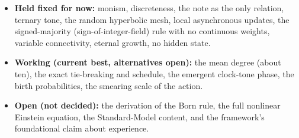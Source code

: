 \begin{itemize}
\item \textbf{Held fixed for now:} monism, discreteness, the note as the only relation,
ternary tone, the random hyperbolic mesh, local asynchronous updates, the
signed-majority (sign-of-integer-field) rule with no continuous weights, variable
connectivity, eternal growth, no hidden state.
\item \textbf{Working (current best, alternatives open):} the mean degree (about ten),
the exact tie-breaking and schedule, the emergent clock-tone phase, the birth
probabilities, the smearing scale of the action.
\item \textbf{Open (not decided):} the derivation of the Born rule, the full nonlinear
Einstein equation, the Standard-Model content, and the framework's foundational claim
about experience.
\end{itemize}
